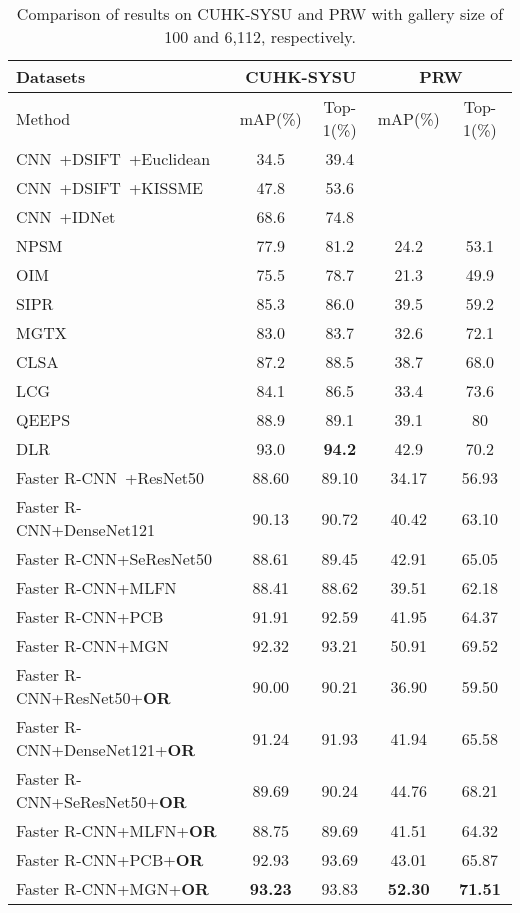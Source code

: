 \documentclass[journal]{IEEEtran}
\begin{document}
\begin{table*}
\begin{center}
\caption{Comparison of results on CUHK-SYSU and PRW with gallery size of 100 and 6,112, respectively.}
\label{Tab:sysu}
\begin{tabular}{l|cc|cc}
\hline
Datasets& \multicolumn{2}{c|}{CUHK-SYSU}& \multicolumn{2}{c}{PRW}\\
\hline
Method & mAP(\%) & Top-1(\%)& mAP(\%) & Top-1(\%) \\
  \hline
\hline
CNN~\cite{RenHG017}+DSIFT~\cite{ZhaoOW13}+Euclidean & 34.5 & 39.4 & & \\
CNN~\cite{RenHG017}+DSIFT~\cite{ZhaoOW13}+KISSME~\cite{KostingerHWRB12} & 47.8 & 53.6 & & \\
CNN~\cite{RenHG017}+IDNet~\cite{XiaoLWLW17} & 68.6 & 74.8 & &\\
  \hline
NPSM~\cite{LiuFJKZQJY17} & 77.9 & 81.2 &24.2&53.1\\
OIM~\cite{XiaoLWLW17} & 75.5 & 78.7 &21.3&49.9\\
SIPR~\cite{LiYC18} & 85.3 & 86.0 &39.5&59.2\\
MGTX~\cite{ChenZOYT18} & 83.0 & 83.7 & 32.6& 72.1\\
CLSA~\cite{LanZG18} & 87.2 & 88.5 &38.7&68.0\\
LCG~\cite{DBLP:conf/cvpr/YanZNZXY19} & 84.1 & 86.5 & 33.4 & 73.6 \\
QEEPS~\cite{DBLP:conf/cvpr/MunjalATG19} & 88.9 & 89.1 & 39.1 & 80 \\
DLR~\cite{han2019re} & 93.0&\textbf{94.2}&42.9&70.2\\
  \hline
Faster R-CNN~\cite{RenHG017}+ResNet50~\cite{HeZRS15} &88.60&89.10&34.17&56.93\\
Faster R-CNN+DenseNet121~\cite{HuangLMW17} &90.13&90.72 &40.42&63.10\\
Faster R-CNN+SeResNet50~\cite{HuSS18} & 88.61&89.45 &42.91&65.05\\
Faster R-CNN+MLFN~\cite{ChangHX18} &88.41&88.62&39.51&62.18\\
Faster R-CNN+PCB~\cite{SunZYTW18} &91.91&92.59&41.95&64.37\\
Faster R-CNN+MGN~\cite{WangYCLZ18} &92.32&93.21&50.91&69.52\\
\hline
Faster R-CNN+ResNet50+\textbf{OR} &90.00&90.21&36.90&59.50\\
Faster R-CNN+DenseNet121+\textbf{OR} & 91.24& 91.93 &41.94&65.58\\
Faster R-CNN+SeResNet50+\textbf{OR} & 89.69&90.24&44.76&68.21\\
Faster R-CNN+MLFN+\textbf{OR} &88.75&89.69&41.51&64.32\\
Faster R-CNN+PCB+\textbf{OR} &92.93&93.69&43.01&65.87\\
Faster R-CNN+MGN+\textbf{OR} &\textbf{93.23}&93.83&\textbf{52.30}&\textbf{71.51}\\
\hline
\end{tabular}
\end{center}
\end{table*}
\end{document}
